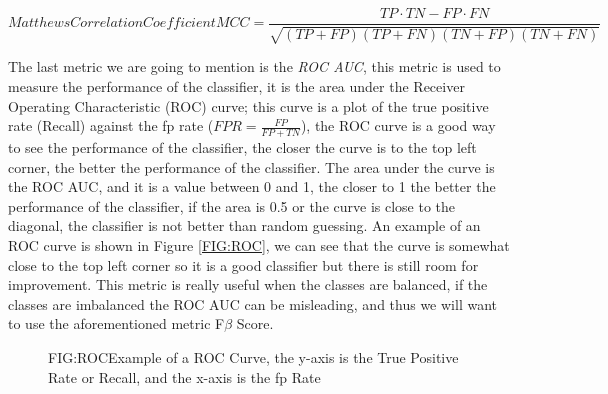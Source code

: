 \begin{equation}[EQ:MCC]{Matthews Correlation Coefficient}
    \boxed{MCC = \frac{TP \cdot TN - FP \cdot FN}{\sqrt{(TP + FP)(TP + FN)(TN + FP)(TN + FN)}}}
\end{equation}

The last metric we are going to mention is the \textit{ROC AUC}, 
this metric is used to measure the performance of the classifier, 
it is the area under 
the Receiver Operating Characteristic (ROC) curve; this curve is a plot of the true positive rate (Recall) against the \acl{fp} rate ($FPR = \frac{FP}{FP + TN}$), the ROC curve is a good way to see the performance of the classifier, the closer the curve is to the top left corner, the better the performance of the classifier. The area under the curve is the ROC AUC, and it is a value between 0 and 1, the closer to 1 the better the performance of the classifier, if the area is 0.5 or the curve is close to the diagonal, the classifier is not better than random guessing. An example of an ROC curve is shown in Figure \ref{FIG:ROC}, we can see that the curve is somewhat close to the top left corner so it is a good classifier but there is still room for improvement. This metric is really useful when the classes are balanced, if the classes are imbalanced the ROC AUC can be misleading, and thus we will want to use the aforementioned metric F$\beta$ Score.

\begin{figure}[ROC Curve Example]{FIG:ROC}{Example of a ROC Curve, the y-axis is the True Positive Rate or Recall, and the x-axis is the \ac{fp} Rate}
\end{figure}

